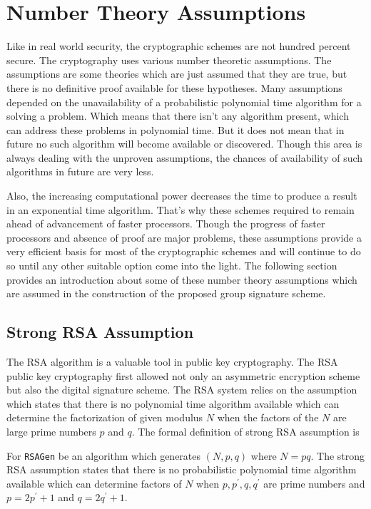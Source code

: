 \section{Number Theory Assumptions}
Like in real world security, the cryptographic schemes are not hundred percent secure. The cryptography uses various number theoretic assumptions. The assumptions are some theories which are just assumed that they are true, but there is no definitive proof available for these hypotheses. Many assumptions depended on the unavailability of a probabilistic polynomial time algorithm for a solving a problem. Which means that there isn't any algorithm present, which can address these problems in polynomial time. But it does not mean that in future no such algorithm will become available or discovered. Though this area is always dealing with the unproven assumptions, the chances of availability of such algorithms in future are very less. 

Also, the increasing computational power decreases the time to produce a result in an exponential time algorithm. That's why these schemes required to remain ahead of advancement of faster processors. Though the progress of faster processors and absence of proof are major problems, these assumptions provide a very efficient basis for most of the cryptographic schemes and will continue to do so until any other suitable option come into the light. The following section provides an introduction about some of these number theory assumptions which are assumed in the construction of the proposed group signature scheme. 

\subsection{Strong RSA Assumption}
The RSA algorithm is a valuable tool in public key cryptography. The RSA public key cryptography first allowed not only an asymmetric encryption scheme but also the digital signature scheme. The RSA system relies on the assumption which states that there is no polynomial time algorithm available which can determine the factorization of given modulus $N$ when the factors of the $N$ are large prime numbers $p$ and $q$. The formal definition of strong RSA assumption is

\begin{definition} For \texttt{RSAGen} be an algorithm which generates $(N, p, q)$ where $N = pq$. The strong RSA assumption states that there is no probabilistic polynomial time algorithm available which can determine factors of $N$ when $p, p^\prime, q, q^\prime$ are prime numbers and $p = 2 p^\prime + 1$ and $q = 2 q^\prime + 1$.
\end{definition}

